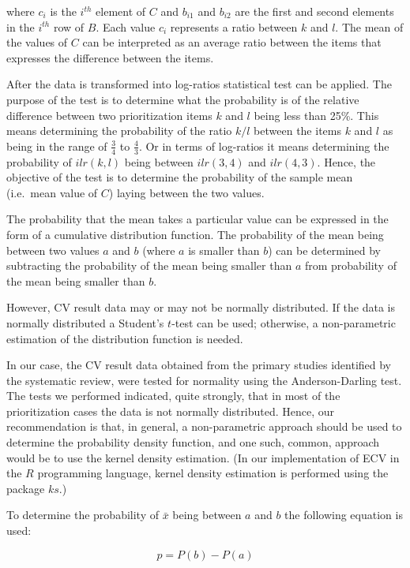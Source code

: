 where $c_{i}$ is the $i^{th}$ element of $C$ and $b_{i1}$ and $b_{i2}$ are the first and second elements in the $i^{th}$ row of $B$.
Each value $c_{i}$ represents a ratio between $k$ and $l$.
The mean of the values of $C$ can be interpreted as an average ratio between the items that expresses the difference between the items.

After the data is transformed into log-ratios statistical test can be applied.
The purpose of the test is to determine what the probability is of the relative difference between two prioritization items $k$ and $l$ being less than 25\%.
This means determining the probability of the ratio $k/l$ between the items $k$ and $l$ as being in the range of $\frac{3}{4}$ to $\frac{4}{3}$. Or in terms of log-ratios it means determining the probability of $ilr(k,l)$ being between $ilr(3,4)$ and $ilr(4,3)$.
Hence, the objective of the test is to determine the probability of the sample mean (i.e.\ mean value of $C$) laying between the two values.

The probability that the mean takes a particular value can be expressed in the form of a cumulative distribution function.
The probability of the mean being between two values $a$ and $b$ (where $a$ is smaller than $b$) can be determined by subtracting the probability of the mean being smaller than $a$ from probability of the mean being smaller than $b$.

However, CV result data may or may not be normally distributed.
If the data is normally distributed a Student's $t$-test can be used; otherwise, a non-parametric estimation of the distribution function is needed.

In our case, the CV result data obtained from the primary studies identified by the systematic review, were tested for normality using the Anderson-Darling test.
The tests we performed indicated, quite strongly, that in most of the prioritization cases the data is not normally distributed.
Hence, our recommendation is that, in general, a non-parametric approach should be used to determine the probability density function, and one such, common, approach would be to use the kernel density estimation.
(In our implementation of ECV in the $R$ programming language, kernel density estimation is performed using the package $ks$.)

To determine the probability of $\bar{x}$ being between $a$ and $b$ the following equation is used:

\begin{equation}
	p=P(b)-P(a)\label{eq:mean-between-a-b}
\end{equation}

